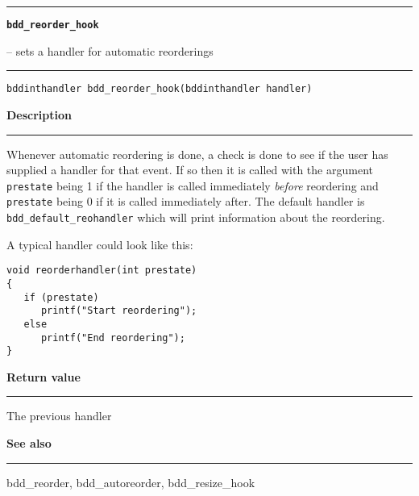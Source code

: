 \begin{minipage}{\textwidth}

\noindent\begin{minipage}{\textwidth}
\rule{\textwidth}{0.5mm}
{\tt\bf bdd\_reorder\_hook }
\--- sets a handler for automatic reorderings  \hspace{\fill}
\\\rule[1.5ex]{\textwidth}{0.5mm}
\end{minipage}

\noindent\begin{verbatim}
bddinthandler bdd_reorder_hook(bddinthandler handler) 
\end{verbatim}

\vspace{\parsep}\noindent
{\bf Description}\\\rule[1.5ex]{\textwidth}{0.2mm}\vspace{-1.5ex}\setlength{\parindent}{1em}
Whenever automatic reordering is done, a check is done to see
           if the user has supplied a handler for that event. If so then
	   it is called with the argument {\tt prestate} being 1 if the
	   handler is called immediately {\em before} reordering and
	   {\tt prestate} being 0 if it is called immediately after.
	   The default handler is
	   {\tt bdd\_default\_reohandler} which will print information
	   about the reordering.

	   A typical handler could look like this:
	   \begin{verbatim}
void reorderhandler(int prestate)
{
   if (prestate)
      printf("Start reordering");
   else
      printf("End reordering");
}
\end{verbatim} 

\setlength{\parindent}{0em}\vspace{\parsep}\vspace{\baselineskip}\noindent
{\bf Return value}\\\rule[1.5ex]{\textwidth}{0.2mm}\vspace{-1.5ex}
The previous handler 

\vspace{\parsep}\vspace{\baselineskip}\noindent
{\bf See also}\\\rule[1.5ex]{\textwidth}{0.2mm}\vspace{-1.5ex}
bdd\_reorder, bdd\_autoreorder, bdd\_resize\_hook 
\end{minipage}
